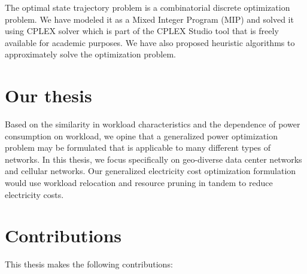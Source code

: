 
The optimal state trajectory problem is a combinatorial discrete optimization problem. We have modeled it as a Mixed Integer Program (MIP) and solved it using CPLEX solver which is part of the CPLEX Studio tool that is freely available for academic purposes. We have also proposed heuristic algorithms to approximately solve the optimization problem.

\section{Our thesis} Based on the similarity in workload characteristics and the dependence of power consumption on workload, we opine that a generalized power optimization problem may be formulated that is applicable to many different types of networks. In this thesis, we focus specifically on geo-diverse data center networks and cellular networks. Our generalized electricity cost optimization formulation would use workload relocation and resource pruning in tandem to reduce electricity costs.%

\section{Contributions} This thesis makes the following contributions:

